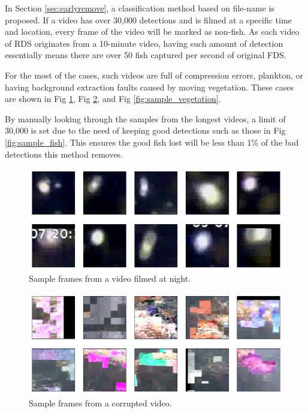\documentclass[bsc,logo,twoside,fullspacing,parskip]{infthesis}
\begin{document}
\begin{appendices}
In Section \ref{sec:earlyremove}, a classification method based on file-name is proposed.
If a video has over 30,000 detections and is filmed at a specific time and location, every frame of the video will be marked as non-fish. 
As each video of RDS originates from a 10-minute video, having such amount of detection essentially means there are over 50 fish captured per second of original FDS.

For the most of the cases, such videos are full of compression errors, plankton, or having background extraction faults caused by moving vegetation. These cases are shown in Fig \ref{fig:sample_night}, Fig \ref{fig:sample_corrupt}, and Fig \ref{fig:sample_vegetation}.

By manually looking through the samples from the longest videos, a limit of 30,000 is set due to the need of keeping good detections such as those in Fig \ref{fig:sample_fish}. This ensures the good fish lost will be less than 1\% of the bad detections this method removes.

\begin{figure}
\centering
    \includegraphics[scale=0.46]{graph/sample_night.png}
    \caption{Sample frames from a video filmed at night.}
    \label{fig:sample_night}
\end{figure}

\begin{figure}
\centering
    \includegraphics[scale=0.46]{graph/sample_corrupt.png}
    \caption{Sample frames from a corrupted video.}
    \label{fig:sample_corrupt}
\end{figure}


\end{appendices}
\end{document}
